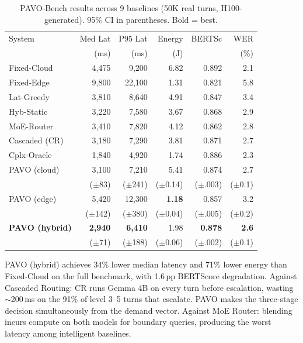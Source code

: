 \documentclass{article}
\begin{document}
\begin{table}[t]
\centering
\caption{PAVO-Bench results across 9 baselines (50K real turns, H100-generated). 95\% CI in parentheses. Bold = best.}
\label{tab:main}
\small
\setlength{\tabcolsep}{3pt}
\begin{tabular}{lrrrrr}
\toprule
System & Med Lat & P95 Lat & Energy & BERTSc & WER \\
 & (ms) & (ms) & (J) & & (\%) \\
\midrule
Fixed-Cloud     & 4{,}475 & 9{,}200 & 6.82 & 0.892 & 2.1 \\
Fixed-Edge      & 9{,}800 & 22{,}100 & 1.31 & 0.821 & 5.8 \\
Lat-Greedy      & 3{,}810 & 8{,}640 & 4.91 & 0.847 & 3.4 \\
Hyb-Static      & 3{,}220 & 7{,}580 & 3.67 & 0.868 & 2.9 \\
MoE-Router      & 3{,}410 & 7{,}820 & 4.12 & 0.862 & 2.8 \\
Cascaded (CR)   & 3{,}180 & 7{,}290 & 3.81 & 0.871 & 2.7 \\
Cplx-Oracle     & 1{,}840 & 4{,}920 & 1.74 & 0.886 & 2.3 \\
\midrule
PAVO (cloud)    & 3{,}100 & 7{,}210 & 5.41 & 0.874 & 2.7 \\
                & ($\pm$83) & ($\pm$241) & ($\pm$0.14) & ($\pm$.003) & ($\pm$0.1) \\
PAVO (edge)     & 5{,}420 & 12{,}300 & \textbf{1.18} & 0.857 & 3.2 \\
                & ($\pm$142) & ($\pm$380) & ($\pm$0.04) & ($\pm$.005) & ($\pm$0.2) \\
\textbf{PAVO (hybrid)} & \textbf{2{,}940} & \textbf{6{,}410} & 1.98 & \textbf{0.878} & \textbf{2.6} \\
                & ($\pm$71) & ($\pm$188) & ($\pm$0.06) & ($\pm$.002) & ($\pm$0.1) \\
\bottomrule
\end{tabular}
\end{table}

PAVO (hybrid) achieves 34\% lower median latency and 71\% lower energy than Fixed-Cloud on the full benchmark, with 1.6\,pp BERTScore degradation. Against Cascaded Routing: CR runs Gemma 4B on every turn before escalation, wasting $\sim$200\,ms on the 91\% of level 3--5 turns that escalate. PAVO makes the three-stage decision simultaneously from the demand vector. Against MoE Router: blending incurs compute on both models for boundary queries, producing the worst latency among intelligent baselines.
\end{document}
